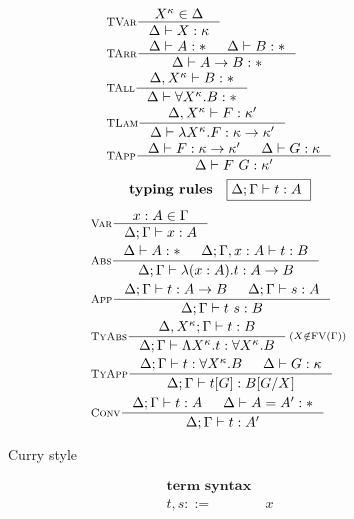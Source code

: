 \begin{figure}
\begin{singlespace}
\begin{minipage}{.46\textwidth}
\begin{align*}
& \inference[\sc TVar]{X^\kappa \in \Delta}{\Delta |- X:\kappa} \\
& \inference[\sc TArr]{\Delta |- A:* & \Delta |- B:*}{\Delta |- A -> B:*} \\
& \inference[\sc TAll]{\Delta,X^\kappa |- B:*}
                      {\Delta |- \forall X^\kappa.B:*} \\
& \inference[\sc TLam]{\Delta,X^\kappa |- F:\kappa'}
                      {\Delta |- \l X^\kappa.F:\kappa -> \kappa'} \\
& \inference[\sc TApp]{\Delta |- F : \kappa -> \kappa' & \Delta |- G : \kappa}
                      {\Delta |- F ~ G : \kappa'} \\
\end{align*}
\[ \textbf{typing rules} \quad \framebox{$ \Delta;\Gamma |- t : A $ } \]
\vspace*{-1em}
\begin{align*}
& \inference[\sc Var]{x:A \in \Gamma}{\Delta;\Gamma |- x:A} \\
& \inference[\sc Abs]{\Delta |- A:* & \Delta;\Gamma,x:A |- t : B}
                     {\Delta;\Gamma |- \l(x:A).t : A -> B} \\
& \inference[\sc App]{\Delta;\Gamma |- t : A -> B & \Delta;\Gamma |- s : A}
                     {\Delta;\Gamma |- t~s : B} \\
& \inference[\sc TyAbs]{\Delta,X^\kappa;\Gamma |- t : B}
                       {\Delta;\Gamma |- \L X^\kappa.t : \forall X^\kappa.B}
	 \begin{smallmatrix}(X\notin\FV(\Gamma))\end{smallmatrix} \\
& \inference[\sc TyApp]{\Delta;\Gamma |- t : \forall X^\kappa.B & \Delta |- G:\kappa}
                       {\Delta;\Gamma |- t[G] : B[G/X]} \\
& \inference[\sc Conv]{\Delta;\Gamma |- t : A & \Delta |- A = A' : *}
                      {\Delta;\Gamma |- t : A'}
\end{align*}
\end{minipage}
\begin{minipage}{.46\textwidth}
        \begin{center}Curry style\end{center}\vspace*{-1em}
\def\baselinestretch{0}
\small
\begin{align*}
\textbf{term syntax} \\
t,s ::= &~ x           \\

\end{align*}
\end{minipage}
\end{singlespace}
\end{figure}
